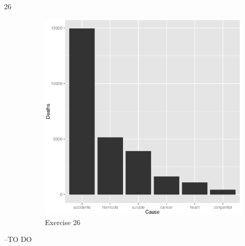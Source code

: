 \documentclass{exam}
\begin{document}
\begin{description}
      \item[26]
        \begin{figure}[H]
          \centering
          \includegraphics[scale = 0.5]{ex26.eps}
          \caption{Exercise 26}
        \end{figure}
    \end{description}

  \else
    \vspace{9 cm}
    \begin{quote}
      \begin{em}
      \end{em}
    \end{quote}
    \hspace{1 cm} --TO DO
  \fi
\end{document}
